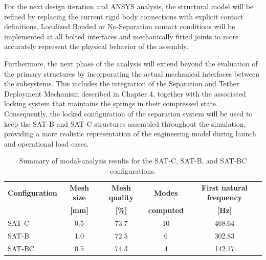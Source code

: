 For the next design iteration and ANSYS analysis, the structural model will be refined by replacing the current rigid body connections with explicit contact definitions. Localized Bonded or No-Separation contact conditions will be implemented at all bolted interfaces and mechanically fitted joints to more accurately represent the physical behavior of the assembly.

Furthermore, the next phase of the analysis will extend beyond the evaluation of the primary structures by incorporating the actual mechanical interfaces between the subsystems. This includes the integration of the Separation and Tether Deployment Mechanism described in Chapter 4, together with the associated locking system that maintains the springs in their compressed state. Consequently, the locked configuration of the separation system will be used to keep the SAT-B and SAT-C structures assembled throughout the simulation, providing a more realistic representation of the engineering model during launch and operational load cases.



\begin{table}[htbp]
\centering
\caption{Summary of modal-analysis results for the SAT-C, SAT-B, and SAT-BC configurations.}
\label{tab:structural_modal_summary}
\begin{tabular}{lcccc}
\toprule
\textbf{Configuration} & \textbf{Mesh size} & \textbf{Mesh quality} & \textbf{Modes} & \textbf{First natural frequency} \\
 & \textbf{[mm]} & \textbf{[\%]} & \textbf{computed} & \textbf{[Hz]} \\
\midrule
SAT-C  & 0.5 & 73.7 & 10 & 468.64 \\
SAT-B  & 1.0 & 72.5 & 6  & 302.83 \\
SAT-BC & 0.5 & 74.3 & 4  & 142.17 \\
\bottomrule
\end{tabular}
\end{table}
